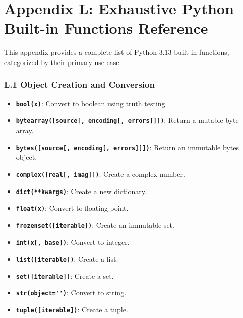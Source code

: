 \hypertarget{appendix-l-exhaustive-python-built-in-functions-reference}{%
\chapter{Appendix L: Exhaustive Python Built-in Functions
Reference}\label{appendix-l-exhaustive-python-built-in-functions-reference}}

This appendix provides a complete list of Python 3.13 built-in
functions, categorized by their primary use case.

\hypertarget{l.1-object-creation-and-conversion}{%
\subsection{L.1 Object Creation and
Conversion}\label{l.1-object-creation-and-conversion}}

\begin{itemize}
\tightlist
\item
  \textbf{\passthrough{\lstinline!bool(x)!}}: Convert to boolean using
  truth testing.
\item
  \textbf{\passthrough{\lstinline!bytearray([source[, encoding[, errors]]])!}}:
  Return a mutable byte array.
\item
  \textbf{\passthrough{\lstinline!bytes([source[, encoding[, errors]]])!}}:
  Return an immutable bytes object.
\item
  \textbf{\passthrough{\lstinline!complex([real[, imag]])!}}: Create a
  complex number.
\item
  \textbf{\passthrough{\lstinline!dict(**kwargs)!}}: Create a new
  dictionary.
\item
  \textbf{\passthrough{\lstinline!float(x)!}}: Convert to
  floating-point.
\item
  \textbf{\passthrough{\lstinline!frozenset([iterable])!}}: Create an
  immutable set.
\item
  \textbf{\passthrough{\lstinline!int(x[, base])!}}: Convert to integer.
\item
  \textbf{\passthrough{\lstinline!list([iterable])!}}: Create a list.
\item
  \textbf{\passthrough{\lstinline!set([iterable])!}}: Create a set.
\item
  \textbf{\passthrough{\lstinline!str(object='')!}}: Convert to string.
\item
  \textbf{\passthrough{\lstinline!tuple([iterable])!}}: Create a tuple.
\end{itemize}

